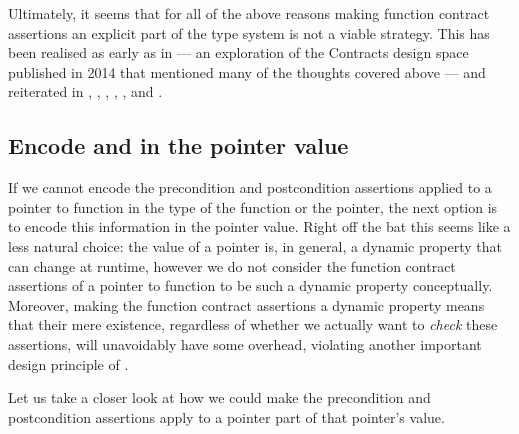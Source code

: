 %
% 
%


Ultimately, it seems that for all of the above reasons making function contract assertions an explicit part of the type system is not a viable strategy. This has been realised as early as in \cite{N4110} --- an exploration of the Contracts design space published in 2014 that mentioned many of the thoughts covered above --- and reiterated in \cite{N4415}, \cite{P0246R0}, \cite{P0247R0}, \cite{P0287R0}, \cite{P0380R1}, and \cite{P0542R5}.

\subsection{Encode  and  in the pointer value}

If we cannot encode the precondition and postcondition assertions applied to a pointer to function in the type of the function or the pointer, the next option is to encode this information in the pointer value. Right off the bat this seems like a less natural choice: the value of a pointer is, in general, a dynamic property that can change at runtime, however we do not consider the function contract assertions of a pointer to function to be such a dynamic property conceptually. Moreover, making the function contract assertions a dynamic property means that their mere existence, regardless of whether we actually want to \emph{check} these assertions, will unavoidably have some overhead, violating another important design principle of \cite{P2900R7}.

Let us take a closer look at how we could make the precondition and postcondition assertions apply to a pointer part of that pointer's value.

